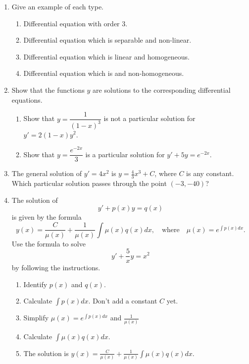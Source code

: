 \documentclass[12pt]{article}
\newcommand{\ratkaisu}[1]{{\color{blue}\quad\textrm{Solution } #1}}
\renewcommand{\ratkaisu}[1]{}
\begin{document}
\begin{enumerate}
\item 
Give an example of each type.
\begin{enumerate}
\item Differential equation with order $3$.\ratkaisu{K, N}
\item Differential equation which is separable and non-linear.\ratkaisu{K,M}
\item Differential equation which is linear and homogeneous.\ratkaisu{L,N}
\item Differential equation which is and non-homogeneous.\ratkaisu{None}
\end{enumerate}

\item Show that the functions $y$ are solutions to the corresponding differential equations.
\begin{enumerate}
\item Show that $y=\dfrac{1}{(1-x)^3}$ is not a particular solution for $y'=2(1-x)y^2$.
\item Show that $y=\dfrac{e^{-2x}}{3}$ is a particular solution for $y'+5y=e^{-2x}$.
\end{enumerate}
\ratkaisu{(a) The derivative is
$$
y'=\frac{d}{dx}(1-x)^{-2}=-2\cdot (1-x)^{-2-1}\frac{d}{dx}(1-x)=-2\cdot (1-x)^{-3}\cdot(-1)=\frac{2}{(1-x)^3}.
$$
Moreover
$$
2(1-x)y^2=\frac{2}{(1-x)^3}=y'.
$$
(b) We have
$$
y'+5y=\frac{-2}{3}e^{-2x}+\frac{5}{3}e^{-2x}
=\frac{3}{3}e^{-2x}=e^{-2x}.
$$
}

\item The general solution of $y'=4x^2$ is $y=\frac{4}{3}x^3+C$, where $C$ is any constant. Which particular solution passes through the point $(-3,-40)$?
\ratkaisu{We have $y(x)=y=\frac{4}{3}x^3+C.$ Set $x=-3$ and $y(-3)=-40$ to obtain
$$
-40=\frac{4}{3}(-3)^3+C,
$$
that is
$$
-40=-36+C.
$$
We have $C=-4$. The desired solution is $y(x)=y=\frac{4}{3}x^3-4$.
}
\newpage

\item The solution of
$$
y'+p(x)y=q(x)
$$
is given by the formula
$$
y(x)=\frac{C}{\mu(x)}+\frac{1}{\mu(x)}\int \mu(x)q(x)dx,\quad\textrm{where}\quad
\mu(x)=e^{\int p(x)dx}.
$$
Use the formula to solve
$$
y'+\frac{5}{x}y=x^2
$$
by following the instructions.
\begin{enumerate}
\item Identify $p(x)$ and $q(x)$.\ratkaisu{$p(x)=-\frac{5}{x}$ and $q(x)=x^2$}
\item Calculate $\int p(x)dx$. Don't add a constant $C$ yet.\ratkaisu{$\int p(x)dx=-5\ln(x)$}
\item Simplify $\mu(x)=e^{\int p(x)dx}$ and $\frac{1}{\mu(x)}$\ratkaisu{$\mu(x)=\dfrac{1}{x^5}$ and $\frac{1}{\mu(x)}=x^5$}
\item Calculate $\int \mu(x)q(x)dx$.
\ratkaisu{$-\frac{1}{2x^2}$}
\item The solution is $y(x)=\frac{C}{\mu(x)}+\frac{1}{\mu(x)}\int \mu(x)q(x)dx$.
\ratkaisu{$y(x)=Cx^5-\frac12 x^3$}
\end{enumerate}


\end{enumerate}
\end{document}
